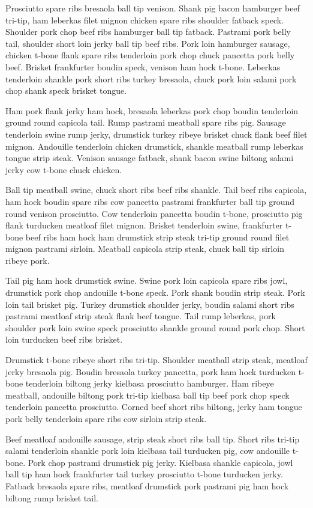 Prosciutto spare ribs bresaola ball tip venison. Shank pig bacon hamburger beef tri-tip, ham leberkas filet mignon chicken spare ribs shoulder fatback speck. Shoulder pork chop beef ribs hamburger ball tip fatback. Pastrami pork belly tail, shoulder short loin jerky ball tip beef ribs. Pork loin hamburger sausage, chicken t-bone flank spare ribs tenderloin pork chop chuck pancetta pork belly beef. Brisket frankfurter boudin speck, venison ham hock t-bone. Leberkas tenderloin shankle pork short ribs turkey bresaola, chuck pork loin salami pork chop shank speck brisket tongue.

Ham pork flank jerky ham hock, bresaola leberkas pork chop boudin tenderloin ground round capicola tail. Rump pastrami meatball spare ribs pig. Sausage tenderloin swine rump jerky, drumstick turkey ribeye brisket chuck flank beef filet mignon. Andouille tenderloin chicken drumstick, shankle meatball rump leberkas tongue strip steak. Venison sausage fatback, shank bacon swine biltong salami jerky cow t-bone chuck chicken.

Ball tip meatball swine, chuck short ribs beef ribs shankle. Tail beef ribs capicola, ham hock boudin spare ribs cow pancetta pastrami frankfurter ball tip ground round venison prosciutto. Cow tenderloin pancetta boudin t-bone, prosciutto pig flank turducken meatloaf filet mignon. Brisket tenderloin swine, frankfurter t-bone beef ribs ham hock ham drumstick strip steak tri-tip ground round filet mignon pastrami sirloin. Meatball capicola strip steak, chuck ball tip sirloin ribeye pork.

Tail pig ham hock drumstick swine. Swine pork loin capicola spare ribs jowl, drumstick pork chop andouille t-bone speck. Pork shank boudin strip steak. Pork loin tail brisket pig. Turkey drumstick shoulder jerky, boudin salami short ribs pastrami meatloaf strip steak flank beef tongue. Tail rump leberkas, pork shoulder pork loin swine speck prosciutto shankle ground round pork chop. Short loin turducken beef ribs brisket.

Drumstick t-bone ribeye short ribs tri-tip. Shoulder meatball strip steak, meatloaf jerky bresaola pig. Boudin bresaola turkey pancetta, pork ham hock turducken t-bone tenderloin biltong jerky kielbasa prosciutto hamburger. Ham ribeye meatball, andouille biltong pork tri-tip kielbasa ball tip beef pork chop speck tenderloin pancetta prosciutto. Corned beef short ribs biltong, jerky ham tongue pork belly tenderloin spare ribs cow sirloin strip steak.

Beef meatloaf andouille sausage, strip steak short ribs ball tip. Short ribs tri-tip salami tenderloin shankle pork loin kielbasa tail turducken pig, cow andouille t-bone. Pork chop pastrami drumstick pig jerky. Kielbasa shankle capicola, jowl ball tip ham hock frankfurter tail turkey prosciutto t-bone turducken jerky. Fatback bresaola spare ribs, meatloaf drumstick pork pastrami pig ham hock biltong rump brisket tail.

